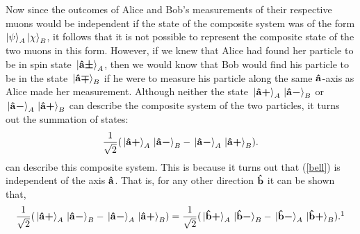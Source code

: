 Now since the outcomes of Alice and Bob's measurements of their respective muons would be independent if the state of the composite system was of the form $\ket{\psi}_A\ket{\chi}_B$, it follows that it is not possible to represent the composite state of the two muons in this form. However, if we knew that Alice had found her particle to be in spin state $\ket*{\vb{\hat{{a}}}\bm{\pm}}_A$, then we would know that Bob would find his particle to be in the state $\ket*{\vb{\hat{{a}}}\bm{\mp}}_B$ if he were to measure his particle along the same $\vb{\hat{{a}}}$-axis as Alice made her measurement. Although neither the state $\ket*{\vb{\hat{{a}}}\bm{+}}_A\ket*{\vb{\hat{{a}}}\bm{-}}_B$ or $\ket*{\vb{\hat{{a}}}\bm{-}}_A\ket*{\vb{\hat{{a}}}\bm{+}}_B$ can describe the composite system of the two particles, it turns out the summation of states:
\begin{equation}\label{bell}
    \frac{1}{\sqrt{2}}(\ket*{\vb{\hat{{a}}}\bm{+}}_A\ket*{\vb{\hat{{a}}}\bm{-}}_B-\ket*{\vb{\hat{{a}}}\bm{-}}_A\ket*{\vb{\hat{{a}}}\bm{+}}_B).
\end{equation}
can describe this composite system. This is because it turns out that (\ref{bell}) is independent of the axis $\vb{\hat{{a}}}$. That is, for any other direction $\vb{\hat{{b}}}$ it can be shown that,
\begin{equation}\label{bellstate2}\frac{1}{\sqrt{2}}(\ket*{\uvbp{a}}_A\ket*{\uvbm{a}}_B-\ket*{\uvbm{a}}_A\ket*{\uvbp{a}}_B)=\frac{1}{\sqrt{2}}(\ket*{\uvbp{b}}_A\ket*{\uvbm{b}}_B-\ket*{\uvbm{b}}_A\ket*{\uvbp{b}}_B).\protect\footnotemark\end{equation}
